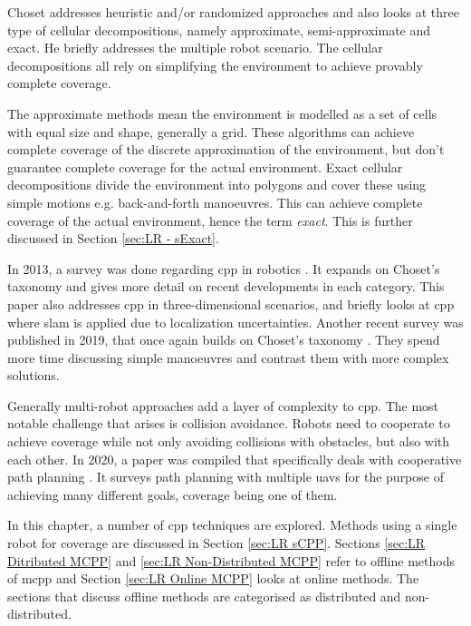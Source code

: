 Choset addresses heuristic and/or randomized approaches and also looks at three type of cellular decompositions, namely approximate, semi-approximate and exact. He briefly addresses the multiple robot scenario. The cellular decompositions all rely on simplifying the environment to achieve provably complete coverage. 

The approximate methods mean the environment is modelled as a set of cells with equal size and shape, generally a grid. These algorithms can achieve complete coverage of the discrete approximation of the environment, but don't guarantee complete coverage for the actual environment. Exact cellular decompositions divide the environment into polygons and cover these using simple motions e.g. back-and-forth manoeuvres. This can achieve complete coverage of the actual environment, hence the term \emph{exact}. This is further discussed in Section \ref{sec:LR - sExact}. 

In 2013, a survey was done regarding \ac{cpp} in robotics \cite{CPP-Survey-2013}. It expands on Choset's taxonomy and gives more detail on recent developments in each category. This paper also addresses \ac{cpp} in three-dimensional scenarios, and briefly looks at \ac{cpp} where \ac{slam} is applied due to localization uncertainties. 
Another recent survey was published in 2019, that once again builds on Choset's taxonomy \cite{CPP-Survey-2019}. They spend more time discussing simple manoeuvres and contrast them with more complex solutions.

Generally multi-robot approaches add a layer of complexity to \ac{cpp}. The most notable challenge that arises is collision avoidance. Robots need to cooperate to achieve coverage while not only avoiding collisions with obstacles, but also with each other. In 2020, a paper was compiled that specifically deals with cooperative path planning \cite{Zhang2020}. It surveys path planning with multiple \acp{uav} for the purpose of achieving many different goals, coverage being one of them.


In this chapter, a number of \ac{cpp} techniques are explored. Methods using a single robot for coverage are discussed in Section \ref{sec:LR sCPP}. Sections \ref{sec:LR Ditributed MCPP} and \ref{sec:LR Non-Distributed MCPP} refer to offline methods of \ac{mcpp} and Section \ref{sec:LR Online MCPP} looks at online methods. The sections that discuss offline methods are categorised as distributed and non-distributed.

